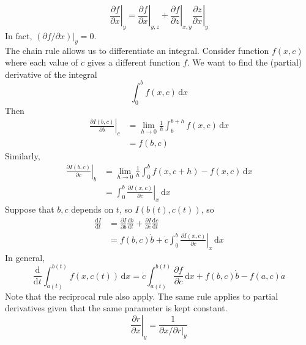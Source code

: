 $$\left.\frac{\partial f}{\partial x}\right|_y=\left.\frac{\partial f}{\partial x}\right|_{y,z}+\left.\frac{\partial f}{\partial z}\right|_{x,y}\left.\frac{\partial z}{\partial x}\right|_y$$
In fact, $(\partial f/\partial x)|_y=0$.\\
The chain rule allows us to differentiate an integral.
Consider  function $f(x,c)$ where each value of $c$ gives a different function $f$.
We want to find the (partial) derivative of the integral
$$\int_0^bf(x,c)\,\mathrm dx$$
Then
\begin{align*}
    \left.\frac{\partial I(b,c)}{\partial b}\right|_c
    &=\lim_{h\to 0}\frac{1}{h}\int_b^{b+h}f(x,c)\,\mathrm dx\\
    &=f(b,c)
\end{align*}
Similarly,
\begin{align*}
    \left.\frac{\partial I(b,c)}{\partial c}\right|_b
    &=\lim_{h\to 0}\frac{1}{h}\int_0^bf(x,c+h)-f(x,c)\,\mathrm dx\\
    &=\int_0^b\left.\frac{\partial I(x,c)}{\partial c}\right|_x\,\mathrm dx
\end{align*}
Suppose that $b,c$ depends on $t$, so $I(b(t),c(t))$, so
\begin{align*}
    \frac{\mathrm dI}{\mathrm dt}
    &=\frac{\partial I}{\partial b}\frac{\mathrm db}{\mathrm dt}+\frac{\partial I}{\partial c}\frac{\mathrm dc}{\mathrm dt}\\
    &=f(b,c)\dot{b}+\dot{c}\int_0^b\left.\frac{\partial I(x,c)}{\partial c}\right|_x\,\mathrm dx
\end{align*}
In general,
$$\frac{\mathrm d}{\mathrm dt}\int_{a(t)}^{b(t)}f(x,c(t))\,\mathrm dx=\dot{c}\int_{a(t)}^{b(t)}\frac{\partial f}{\partial c}\,\mathrm dx+f(b,c)\dot{b}-f(a,c)\dot{a}$$
Note that the reciprocal rule also apply.
The same rule applies to partial derivatives given that the same parameter is kept constant.
$$\left.\frac{\partial r}{\partial x}\right|_y=\frac{1}{\partial x/\partial r|_y}$$